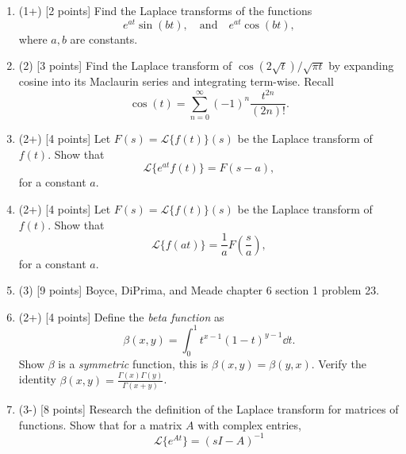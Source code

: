 \documentclass[12pt]{article}
\newcommand{\cL}{\mathcal{L}}
\begin{document}
\begin{enumerate}
   \item (1+) [2 points] Find the Laplace transforms of the functions
         \[
            e^{at}\sin(bt),\quad\text{and}\quad e^{at}\cos(bt),
         \]
         where \(a,b\) are constants.

   \item (2) [3 points] Find the Laplace transform of \(\cos(2\sqrt{t})/\sqrt{\pi t}\) by expanding cosine into its Maclaurin series and integrating term-wise. Recall
         \[
            \cos(t)=\sum_{n=0}^{\infty}(-1)^n\frac{t^{2n}}{(2n)!}.
         \]
   \item (2+) [4 points] Let \(F(s)=\cL\lbrace f(t)\rbrace(s)\) be the Laplace transform of \(f(t)\). Show that
         \[
            \cL\lbrace e^{at}f(t)\rbrace=F(s-a),
         \]
         for a constant \(a\).

   \item (2+) [4 points] Let \(F(s)=\cL\lbrace f(t)\rbrace(s)\) be the Laplace transform of \(f(t)\). Show that
         \[
            \cL\lbrace f(at)\rbrace=\frac{1}{a}F\left(\frac{s}{a}\right),
         \]
         for a constant \(a\).

   \item (3) [9 points] Boyce, DiPrima, and Meade chapter 6 section 1 problem 23.

   \item (2+) [4 points] Define the \emph{beta function} as
         \[
            \beta(x,y)=\int_{0}^{1}t^{x-1}(1-t)^{y-1}\dd t.
         \]
         Show \(\beta\) is a \emph{symmetric} function, this is \(\beta(x,y)=\beta(y,x)\). Verify the identity \(\beta(x,y)=\frac{\Gamma(x)\Gamma(y)}{\Gamma(x+y)}\).

   \item (3-) [8 points] Research the definition of the Laplace transform for matrices of functions. Show that for a matrix \(A\) with complex entries,
         \[
            \cL\lbrace e^{At}\rbrace =\left(sI-A\right)^{-1}
         \]
\end{enumerate}
\end{document}
